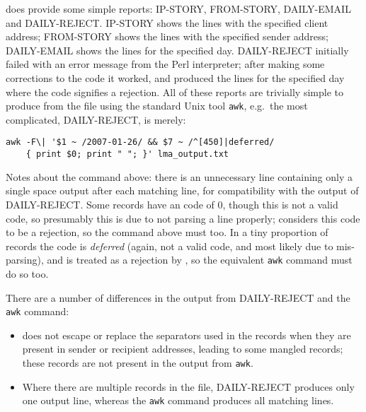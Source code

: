 \documentclass[a4paper,12pt,draft]{article}
\begin{document}
\LMA{} does provide some simple reports: IP-STORY, FROM-STORY, DAILY-EMAIL
and DAILY-REJECT\@.  IP-STORY shows the \CSV{} lines with the specified
client \IP{} address; FROM-STORY shows the \CSV{} lines with the specified
sender address; DAILY-EMAIL shows the \CSV{} lines for the specified day.
DAILY-REJECT initially failed with an error message from the Perl
interpreter; after making some corrections to the code it worked, and
produced the \CSV{} lines for the specified day where the \SMTP{} code
signifies a rejection.  All of these reports are trivially simple to
produce from the \CSV{} file using the standard Unix tool \texttt{awk},
e.g.\ the most complicated, DAILY-REJECT, is merely:

\begin{verbatim}
awk -F\| '$1 ~ /2007-01-26/ && $7 ~ /^[450]|deferred/
    { print $0; print " "; }' lma_output.txt
\end{verbatim}

Notes about the command above: there is an unnecessary line containing only
a single space output after each matching line, for compatibility with the
output of DAILY-REJECT\@.  Some records have an \SMTP{} code of 0, though
this is not a valid \SMTP{} code, so presumably this is due to \LMA{} not
parsing a line properly; \LMA{} considers this code to be a rejection, so
the command above must too.  In a tiny proportion of records the \SMTP{}
code is \textit{deferred\/} (again, not a valid code, and most likely due
to mis-parsing), and is treated as a rejection by \LMA{}, so the equivalent
\texttt{awk} command must do so too.

There are a number of differences in the output from DAILY-REJECT and the
\texttt{awk} command:

\begin{itemize}

    \item \LMA{} does not escape or replace the separators used in the
        \CSV{} records when they are present in sender or recipient
        addresses, leading to some mangled records; these records are not
        present in the output from \texttt{awk}.

    \item Where there are multiple records in the \CSV{} file, DAILY-REJECT
        produces only one output line, whereas the \texttt{awk} command
        produces all matching lines.

\end{itemize}
\end{document}
